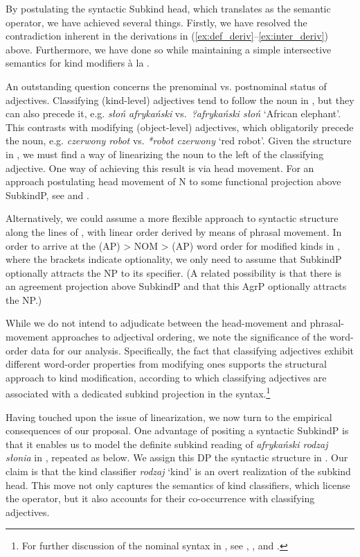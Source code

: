 \documentclass[output=paper]{langscibook}
\begin{document}
\noindent
By postulating the syntactic Subkind head, which translates as the semantic  operator, we have achieved several things. Firstly, we have resolved the contradiction inherent in the derivations in (\ref{ex:def_deriv}--\ref{ex:inter_deriv}) above. Furthermore, we have done so while maintaining a simple intersective semantics for kind modifiers à la \citet{McNally.Boleda2004}.

An outstanding question concerns the prenominal vs. postnominal status of  adjectives. Classifying (kind-level) adjectives tend to follow the noun in , but they can also precede it, e.g. \textit{słoń afrykański} vs.\ \textit{?afrykański słoń} `African elephant'. This contrasts with modifying (object-level) adjectives, which obligatorily precede the noun, e.g. \textit{czerwony robot} vs. \textit{*robot czerwony} `red robot'. Given the structure in , we must find a way of linearizing the noun to the left of the classifying adjective. One way of achieving this result is via head movement. For an approach postulating head movement of N to some functional projection above SubkindP, see \citet{Rutkowski.Progovac2005} and \citet{Rutkowski2012}.

Alternatively, we could assume a more flexible approach to syntactic structure along the lines of \citet{Cinque2005, Cinque2010}, with linear order derived by means of phrasal movement. In order to arrive at the (AP) > NOM > (AP) word order for modified kinds in , where the brackets indicate optionality, we only need to assume that SubkindP optionally attracts the NP to its specifier. (A related possibility is that there is an agreement projection above SubkindP and that this AgrP optionally attracts the NP.)

While we do not intend to adjudicate between the head-movement and phrasal-movement approaches to adjectival ordering, we note the significance of the word-order data for our analysis. Specifically, the fact that classifying adjectives exhibit different word-order properties from modifying ones supports the structural approach to kind modification, according to which classifying adjectives are associated with a dedicated subkind projection in the syntax.\footnote{For further discussion of the nominal syntax in , see \citet{Ceglowski2017}, \citet{Witkos.etal2018}, and \citet{Witkos.Dziubala.Szrejbrowska2018}.}

Having touched upon the issue of linearization, we now turn to the empirical consequences of our proposal. One advantage of positing a syntactic SubkindP is that it enables us to model the definite subkind reading of \textit{afrykański rodzaj słonia} in , repeated as  below. We assign this DP the syntactic structure in . Our claim is that the kind classifier \textit{rodzaj} `kind' is an overt realization of the subkind head. This move not only  captures the semantics of kind classifiers, which license the  operator, but it also accounts for their co-occurrence with classifying adjectives.
\end{document}
